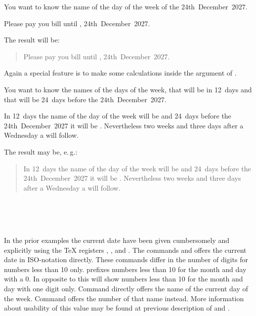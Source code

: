 \begin{Example}
  You want to know the name of the day of the week of the 24th~December~2027.
\begin{lstcode}
  Please pay you bill until ,
  24th~December~2027.
\end{lstcode}
  The result will be:
  \begin{quote}
    Please pay you bill until ,
    24th~December~2027.
  \end{quote}
\end{Example}

Again a special feature is to make some calculations inside the argument of
.
\begin{Example}
  You want to know the names of the days of the week, that will be in 12~days
  and that will be 24~days before the 24th~December~2027.
\begin{lstcode}
  In 12~days the name of the day of the week
  will be  and
  24~days before the 24th~December~2027 it will be
  . Nevertheless two weeks
  and three days after a Wednesday a
   will follow.
\end{lstcode}
  The result may be, e.\,g.:
  \begin{quote}
    In 12~days the name of the day of the week
    will be  and
    24~days before the 24th~December~2027 it will be
    . Nevertheless two weeks
    and three days after a Wednesday a
     will follow.
  \end{quote}
\end{Example}%
%
%
%
%


\begin{Declaration}
  \\%
  \\
  \\%
\end{Declaration}%
%
%
%
%
In the prior examples the current date have been given cumbersomely and
explicitly using the \TeX{} registers ,
, and . The commands
 and 
offers the current date in ISO-notation directly. These commands differ in the
number of digits for numbers less than 10 only.  prefixes
numbers less than 10 for the month and day with a 0. In opposite to this
 will show numbers less than 10 for the month and day with one
digit only. Command  directly offers the name of the current
day of the week. Command  offers the number of that name
instead. More information about usability of this value may be found at
previous description of  and .

